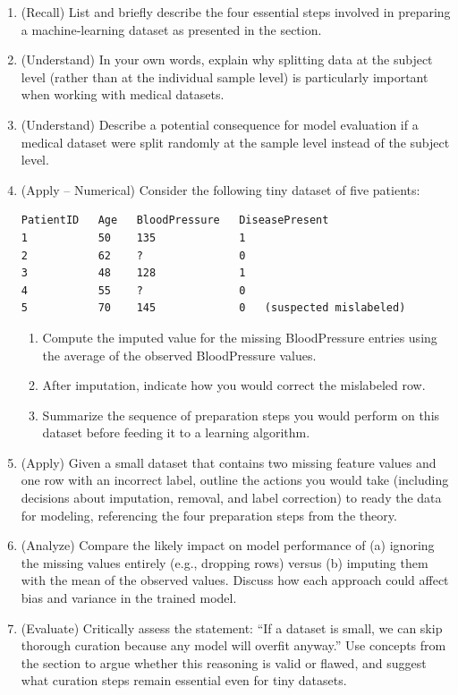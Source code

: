\documentclass[12pt, a4paper]{article}
\begin{document}
\begin{enumerate}
\item (Recall) List and briefly describe the four essential steps involved in preparing a machine‑learning dataset as presented in the section.
\newpage
\item (Understand) In your own words, explain why splitting data at the subject level (rather than at the individual sample level) is particularly important when working with medical datasets.
\newpage
\item (Understand) Describe a potential consequence for model evaluation if a medical dataset were split randomly at the sample level instead of the subject level.
\newpage
\item (Apply – Numerical) Consider the following tiny dataset of five patients:

\begin{verbatim}
PatientID   Age   BloodPressure   DiseasePresent
1           50    135             1
2           62    ?               0
3           48    128             1
4           55    ?               0
5           70    145             0   (suspected mislabeled)
\end{verbatim}

\begin{enumerate}
\item Compute the imputed value for the missing BloodPressure entries using the average of the observed BloodPressure values.
\item After imputation, indicate how you would correct the mislabeled row.
\item Summarize the sequence of preparation steps you would perform on this dataset before feeding it to a learning algorithm.
\end{enumerate}
\newpage
\item (Apply) Given a small dataset that contains two missing feature values and one row with an incorrect label, outline the actions you would take (including decisions about imputation, removal, and label correction) to ready the data for modeling, referencing the four preparation steps from the theory.
\newpage
\item (Analyze) Compare the likely impact on model performance of (a) ignoring the missing values entirely (e.g., dropping rows) versus (b) imputing them with the mean of the observed values. Discuss how each approach could affect bias and variance in the trained model.
\newpage
\item (Evaluate) Critically assess the statement: “If a dataset is small, we can skip thorough curation because any model will overfit anyway.” Use concepts from the section to argue whether this reasoning is valid or flawed, and suggest what curation steps remain essential even for tiny datasets.
\newpage
\end{enumerate}
\end{document}
